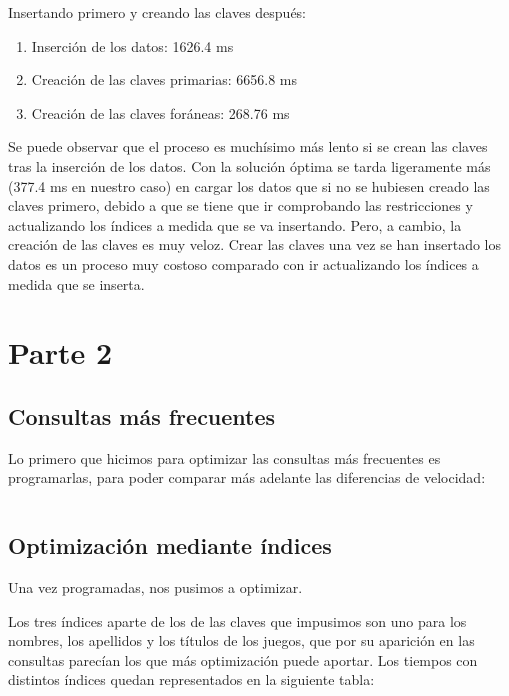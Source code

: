 \documentclass[a4paper, 11pt, oneside]{article} %
\newcommand{\scriptdir}{../scripts/} %
\begin{document}
Insertando primero y creando las claves después:

\begin{enumerate}
	\item Inserción de los datos: 1626.4 ms
	\item Creación de las claves primarias: 6656.8 ms
	\item Creación de las claves foráneas: 268.76 ms
\end{enumerate}

Se puede observar que el proceso es muchísimo más lento si se crean las claves tras la inserción de los datos. Con la solución óptima se tarda ligeramente más (377.4 ms en nuestro caso) en cargar los datos que si no se hubiesen creado las claves primero, debido a que se tiene que ir comprobando las restricciones y actualizando los índices a medida que se va insertando. Pero, a cambio, la creación de las claves es muy veloz. Crear las claves una vez se han insertado los datos es un proceso muy costoso comparado con ir actualizando los índices a medida que se inserta.


	
\newpage


\section{Parte 2}

\subsection{Consultas más frecuentes}

Lo primero que hicimos para optimizar las consultas más frecuentes es programarlas, para poder comparar más adelante las diferencias de velocidad:

\inputminted{mysql}{\scriptdir consultas/procedures.sql}

\subsection{Optimización mediante índices}

Una vez programadas, nos pusimos a optimizar.

Los tres índices aparte de los de las claves que impusimos son uno para los nombres, los apellidos y los títulos de los juegos, que por su aparición en las consultas parecían los que más optimización puede aportar. Los tiempos con distintos índices quedan representados en la siguiente tabla:
\end{document}
